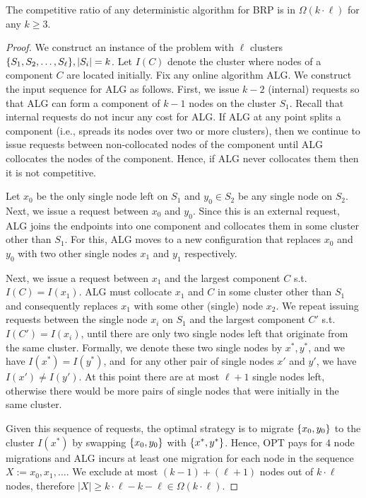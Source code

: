\documentclass[manuscript,screen=true, review, anonymous]{acmart}
\newcommand{\ALG}{\textsf{ALG}\xspace}
\newcommand{\OBRP}{BRP}
\newcommand{\PPOBRP}{PP-BRP}
\DeclarePairedDelimiter\set{\{}{\}}
\newcommand\maciek[1]{\color{brown}\textbf{\\ Maciek: #1}\color{black}}
\begin{document}

\begin{theorem}
	The competitive ratio of any deterministic algorithm for \OBRP{} is in $\Omega(k\cdot \ell)$ for any $k\geq 3$.
\end{theorem}

\begin{proof}
	We construct an instance of the problem with $\ell$ clusters 
	$\set{ S_1, S_2,\dots , S_{\ell}}, |S_i|  = k$.
	Let $I(C)$ denote the cluster where nodes of a component $C$ are located initially.
	Fix any online algorithm \ALG{}.
	We construct the input sequence for \ALG{} as follows.
	First,
	we issue $k-2$ (internal) requests so that \ALG{} can form a component of $k-1$
	nodes on the cluster $S_1$.
	Recall that internal requests do not incur any cost for \ALG{}.
	If \ALG{} at any point splits a component
	(i.e., spreads its nodes over two or more clusters),
	then we continue to issue requests between non-collocated nodes of the component until \ALG{} collocates the nodes of the component.
	Hence, if \ALG{} never collocates them then it is not competitive.
  
	Let $x_0$  be the only single node left on $S_1$ and  $y_0 \in S_2$ be any single node on $S_2$.
	Next,
	we issue a request between $x_0$ and $y_0$.
	Since this is an external request,
	\ALG{} joins the endpoints into one component and collocates them in some cluster other than $S_1$.
	For this,
	\ALG{} moves to a new configuration
	that replaces $x_0$ and $y_0$ with two other single nodes $x_1$ and $y_1$ respectively.
	
	Next,
	we issue a request between $x_1$ and the largest component $C$ s.t.~$I(C) = I(x_1)$.
	\ALG{} must collocate $x_1$ and $C$ in some cluster other than $S_1$ and
	consequently replaces $x_1$ with some other (single) node $x_2$.
	We repeat issuing requests between the single node $x_i$ on $S_1$ and the largest component $C'$ s.t.~$I(C')=I(x_i)$,
  until there are only two single nodes left that  originate from the same cluster.
	Formally, we denote these two single nodes by $x^*, y^*$, and we have $I(x^*) = I(y^*)$, and~for any other pair of single nodes
	$x'$ and $y'$,
	we have $I(x') \neq I(y')$.
	At this point there are at most $\ell+1$ single nodes left,
	otherwise there would be more pairs of single nodes that were initially in the same cluster.
	
	Given this sequence of requests,
	the optimal strategy is to migrate $\set{x_0,y_0}$ to the cluster $I(x^*)$ by
	swapping $\set{x_0,y_0}$ with $\set{x^*,y^*}$.
	Hence,
	OPT pays for $4$ node migrations and
	\ALG{} incurs at least one migration for each node in the sequence $X := x_0, x_1,\dots$.
	We exclude at most $(k-1) + ( \ell+1)$ nodes out of $k \cdot \ell$ nodes,
	therefore $|X| \geq k \cdot \ell - k - \ell \in \Omega(k\cdot\ell)$.
\end{proof}
\end{document}
